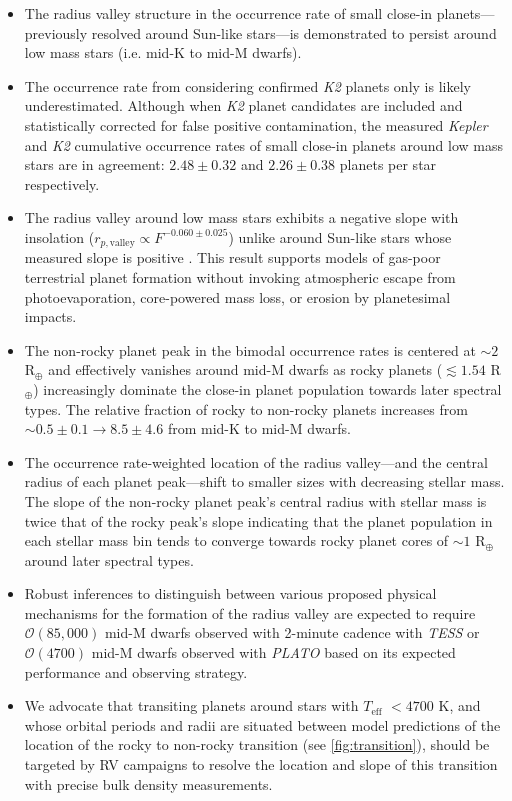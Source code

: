 \documentclass[twocolumn]{emulateapj}
\newcommand{\kepler}[1]{\emph{Kepler}#1}
\newcommand{\ktwo}[1]{\emph{K2}#1}
\newcommand{\tess}[1]{\emph{TESS}#1}
\newcommand{\plato}[1]{\emph{PLATO}#1}
\newcommand{\teff}[1]{$T_{\text{eff}}$#1}
\begin{document}
\begin{itemize}
\item The radius valley structure in the occurrence rate of small close-in planets---previously resolved around
  Sun-like stars---is demonstrated to persist around low mass stars (i.e. mid-K to mid-M dwarfs).
\item The occurrence rate from considering confirmed \ktwo{} planets only is likely underestimated. Although
  when \ktwo{} planet candidates are included and statistically corrected for false positive contamination, the
  measured \kepler{} and \ktwo{} cumulative occurrence rates of small close-in planets around low mass stars
  are in agreement: $2.48\pm 0.32$ and $2.26\pm 0.38$ planets per star respectively.
\item The radius valley around low mass stars exhibits a negative slope with insolation
  ($r_{p,\text{valley}} \propto F^{-0.060\pm 0.025}$) unlike 
  around Sun-like stars whose measured slope is positive
  \citep[$r_{p,\text{valley}} \propto F^{0.12\pm 0.02}$;][]{martinez19}. This result 
  supports models of gas-poor terrestrial planet formation without invoking atmospheric escape from photoevaporation,
  core-powered mass loss, or erosion by planetesimal impacts.
\item The non-rocky planet peak in the bimodal occurrence rates is centered at $\sim 2$ R$_{\oplus}$ and effectively
  vanishes around mid-M dwarfs as rocky planets ($\lesssim 1.54$ R$_{\oplus}$) increasingly dominate the close-in
  planet population towards later spectral types. The relative fraction of rocky to non-rocky planets increases
  from $\sim 0.5\pm 0.1 \to 8.5\pm 4.6$ from mid-K to mid-M dwarfs.
\item The occurrence rate-weighted location of the radius valley---and the central radius of each planet peak---shift
  to smaller
  sizes with decreasing stellar mass. The slope of the non-rocky planet peak's central radius with stellar mass is
  twice that of the rocky peak's slope indicating that the planet population in each stellar mass bin
  tends to converge towards rocky planet cores of $\sim 1$ R$_{\oplus}$ around later spectral types.
\item Robust inferences to distinguish between various proposed physical mechanisms for the formation of the
  radius valley are expected to require $\mathcal{O}(85,000)$ mid-M dwarfs observed with 2-minute cadence with
  \tess{} or $\mathcal{O}(4700)$ mid-M dwarfs observed with \plato{} based on its expected performance and
  observing strategy.
\item We advocate that transiting planets around stars with \teff{} $<4700$ K, and whose orbital periods and radii are
  situated between model predictions of the location of the rocky to non-rocky transition (see \autoref{fig:transition}),
  should be targeted by RV campaigns to resolve the location and slope of this transition with precise bulk density
  measurements. 
\end{itemize}
\end{document}
